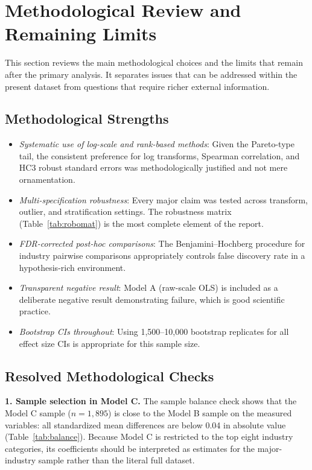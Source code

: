 \documentclass[a4paper,10pt]{article}
\begin{document}
\bigskip

\section{Methodological Review and Remaining Limits}\label{sec:meta}

This section reviews the main methodological choices and the limits that remain after the primary analysis. It separates issues that can be addressed within the present dataset from questions that require richer external information.

\subsection{Methodological Strengths}

\begin{itemize}
  \item \emph{Systematic use of log-scale and rank-based methods}: Given the Pareto-type tail, the consistent preference for log transforms, Spearman correlation, and HC3 robust standard errors was methodologically justified and not mere ornamentation.
  \item \emph{Multi-specification robustness}: Every major claim was tested across transform, outlier, and stratification settings. The robustness matrix (Table~\ref{tab:robomat}) is the most complete element of the report.
  \item \emph{FDR-corrected post-hoc comparisons}: The Benjamini--Hochberg procedure for industry pairwise comparisons appropriately controls false discovery rate in a hypothesis-rich environment.
  \item \emph{Transparent negative result}: Model A (raw-scale OLS) is included as a deliberate negative result demonstrating failure, which is good scientific practice.
  \item \emph{Bootstrap CIs throughout}: Using 1,500--10,000 bootstrap replicates for all effect size CIs is appropriate for this sample size.
\end{itemize}

\bigskip

\subsection{Resolved Methodological Checks}

\medskip
\noindent\textbf{1. Sample selection in Model C.} The sample balance check shows that the Model C sample ($n=1{,}895$) is close to the Model B sample on the measured variables: all standardized mean differences are below 0.04 in absolute value (Table~\ref{tab:balance}). Because Model C is restricted to the top eight industry categories, its coefficients should be interpreted as estimates for the major-industry sample rather than the literal full dataset.
\end{document}
